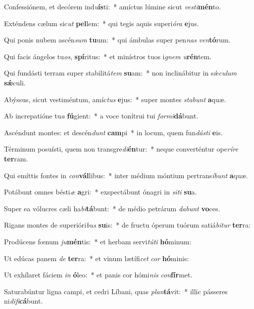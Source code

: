 \item Confessiónem, et decórem ind\textit{u}\textbf{ís}ti:~* amíctus lúmine sicut \textit{ves}\textit{ti}\textbf{mén}to.
\item Exténdens cælum sic\textit{ut} \textbf{pel}lem:~* qui tegis aquis superi\textit{ó}\textit{ra} \textbf{e}jus.
\item Qui ponis nubem ascén\textit{sum} \textbf{tu}um:~* qui ámbulas super pen\textit{nas} \textit{ven}\textbf{tó}rum.
\item Qui facis ángelos tu\textit{os}, \textbf{spí}ritus:~* et minístros tuos i\textit{gnem} \textit{u}\textbf{rén}tem.
\item Qui fundásti terram super stabilitá\textit{tem} \textbf{su}am:~* non inclinábitur in sǽ\textit{cu}\textit{lum} \textbf{sǽ}culi.
\item Abýssus, sicut vestiméntum, amíc\textit{tus} \textbf{e}jus:~* super montes \textit{sta}\textit{bunt} \textbf{a}quæ.
\item Ab increpatióne tu\textit{a} \textbf{fú}gient:~* a voce tonítrui tui \textit{for}\textit{mi}\textbf{dá}bunt.
\item Ascéndunt montes: et descén\textit{dunt} \textbf{cam}pi~* in locum, quem fun\textit{dás}\textit{ti} \textbf{e}is.
\item Términum posuísti, quem non transgre\textit{di}\textbf{én}tur:~* neque converténtur ope\textit{rí}\textit{re} \textbf{ter}ram.
\item Qui emíttis fontes in \textit{con}\textbf{vál}libus:~* inter médium móntium pertrans\textit{í}\textit{bunt} \textbf{a}quæ.
\item Potábunt omnes bésti\textit{æ} \textbf{a}gri:~* exspectábunt ónagri in \textit{si}\textit{ti} \textbf{su}a.
\item Super ea vólucres cæli ha\textit{bi}\textbf{tá}bunt:~* de médio petrárum \textit{da}\textit{bunt} \textbf{vo}ces.
\item Rigans montes de superióri\textit{bus} \textbf{su}is:~* de fructu óperum tuórum satiá\textit{bi}\textit{tur} \textbf{ter}ra:
\item Prodúcens fœnum \textit{ju}\textbf{mén}tis:~* et herbam servi\textit{tú}\textit{ti} \textbf{hó}minum:
\item Ut edúcas panem \textit{de} \textbf{ter}ra:~* et vinum lætífi\textit{cet} \textit{cor} \textbf{hó}minis:
\item Ut exhílaret fáciem \textit{in} \textbf{ó}leo:~* et panis cor hómi\textit{nis} \textit{con}\textbf{fír}met.
\item Saturabúntur ligna campi, et cedri Líbani, quas \textit{plan}\textbf{tá}vit:~* illic pásseres ni\textit{di}\textit{fi}\textbf{cá}bunt.
